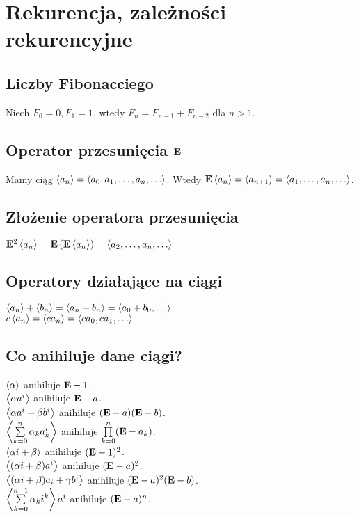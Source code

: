 \section{Rekurencja, zależności rekurencyjne}

\subsection*{Liczby Fibonacciego}
Niech $F_0 = 0, F_1 = 1$, wtedy $F_n = F_{n-1} + F_{n-2}$ dla $n > 1$.

\subsection*{Operator przesunięcia $\mathbf{E}$}
Mamy ciąg $\left\langle a_n \right\rangle = \left\langle a_0, a_1, \ldots, a_n, \ldots \right\rangle$. Wtedy
$\mathbf{E} \left\langle a_n \right\rangle = \left\langle a_{n+1} \right\rangle = \left\langle a_1, \ldots, a_n, \ldots \right\rangle$.

\subsection*{Złożenie operatora przesunięcia}
$\mathbf{E}^2 \left\langle a_n \right\rangle = \mathbf{E} \left( \mathbf{E} \left\langle a_n \right\rangle \right)
= \left\langle a_2, \ldots, a_n, \ldots \right\rangle$

\subsection*{Operatory działające na ciągi}
$\left\langle a_n \right\rangle + \left\langle b_n \right\rangle = \left\langle a_n + b_n \right\rangle = \left\langle a_0 + b_0, 
\ldots \right\rangle$ \\
$c \left\langle a_n \right\rangle = \left\langle c a_n \right\rangle = \left\langle ca_0, ca_1, \ldots \right\rangle$

\subsection*{Co anihiluje dane ciągi?}
$\left\langle \alpha \right\rangle$ anihiluje $\mathbf{E} - 1$. \\
$\left\langle \alpha a^i \right\rangle$ anihiluje $\mathbf{E} - a$. \\
$\left\langle \alpha a^i + \beta b^i \right\rangle$ anihiluje $(\mathbf{E} - a)(\mathbf{E} - b)$. \\
$\left\langle \sum\limits_{k=0}^{n} \alpha_k a_k^i \right\rangle$ anihiluje 
$\prod\limits_{k=0}^{n} (\mathbf{E} - a_k)$. \\
$\left\langle \alpha i + \beta \right\rangle$ anihiluje $(\mathbf{E} - 1)^2$. \\
$\left\langle (\alpha i + \beta) a^i \right\rangle$ anihiluje $(\mathbf{E} - a)^2$. \\
$\left\langle (\alpha i + \beta) a_i + \gamma b^i \right\rangle$ anihiluje
$(\mathbf{E} - a)^2 (\mathbf{E} - b)$. \\
$\left\langle \sum\limits_{k=0}^{n-1} \alpha_k i^k \right\rangle a^i$ anihiluje 
$(\mathbf{E} - a)^n$. \\

